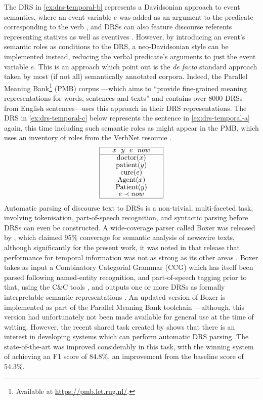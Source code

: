 \documentclass[a4paper,12pt,leqno]{article}
\def\drs#1#2{
\renewcommand{\arraystretch}{0.8}
\begin{tabular}[c]{|>{\hspace{1pc}}c<{\hspace{1pc}}|}
	\hline #1 \\
	\hline #2 \\
	\hline
\end{tabular}
\renewcommand{\arraystretch}{1}
}
\begin{document}
The DRS in \cref{ex:drs-temporal-b} represents a Davidsonian approach to event semantics, where an event variable $e$ was added as an argument to the predicate corresponding to the verb \citep{davidson1967logical,Kamp1993}, and DRSs can also feature discourse referents representing statives as well as eventives \citep[p. 103]{kamp1988discourse}. However, by introducing an event's semantic roles as conditions to the DRS, a neo-Davidsonian style \citep{dowty1989semantic} can be implemented instead, reducing the verbal predicate's arguments to just the event variable $e$. This is an approach which \citet{abzianidze2019thirty,Bunt2020} point out is the \textit{de facto} standard approach taken by most (if not all) semantically annotated corpora. Indeed, the Parallel Meaning Bank\footnote{Available at \url{https://pmb.let.rug.nl/}.} (PMB) corpus \citep{abzianidze2017parallel}---which aims to ``provide fine-grained meaning representations for words, sentences and texts'' and contains over 8000 DRSs from English sentences---uses this approach in their DRS representations. The DRS in \cref{ex:drs-temporal-c} below represents the sentence in \cref{ex:drs-temporal-a} again, this time including such semantic roles as might appear in the PMB, which uses an inventory of roles from the VerbNet resource \citep{schuler2005verbnet}.
\begin{align}
	\drs{$x~~y~~e~~now$}{doctor($x$)\\patient($y$)\\cure($e$)\\Agent($x$)\\Patient($y$)\\$e \prec now$}\label{ex:drs-temporal-c}
\end{align}
Automatic parsing of discourse text to DRSs is a non-trivial, multi-faceted task, involving tokenisation, part-of-speech recognition, and syntactic parsing before DRSs can even be constructed. A wide-coverage parser called Boxer was released by \citet{Bos2008}, which claimed 95\% converage for semantic analysis of newswire texts, although significantly for the present work, it was noted in that release that performance for temporal information was not as strong as its other areas \citep[pp. 283--285]{Bos2008}. Boxer takes as input a Combinatory Categorial Grammar (CCG) \citep{steedman2000syntactic,steedman2011combinatory} which has itself been parsed following named-entity recognition, and part-of-speech tagging prior to that, using the C\&C tools \citep{curran2007linguistically}, and outputs one or more DRSs as formally interpretable semantic representations \citep[p. 285]{Bos2008}. An updated version of Boxer \citep{van-noord-etal-2018-exploring} is implemented as part of the Parallel Meaning Bank toolchain \citep{abzianidze2017parallel}---although, this version had unfortunately not been made available for general use at the time of writing. However, the recent shared task created by \citep{abzianidze2019first} shows that there is an interest in developing systems which can perform automatic DRS parsing. The state-of-the-art was improved considerably in this task, with the winning system of \citet{liu2019discourse} achieving an F1 score of 84.8\%, an improvement from the baseline score of 54.3\%.
\end{document}
